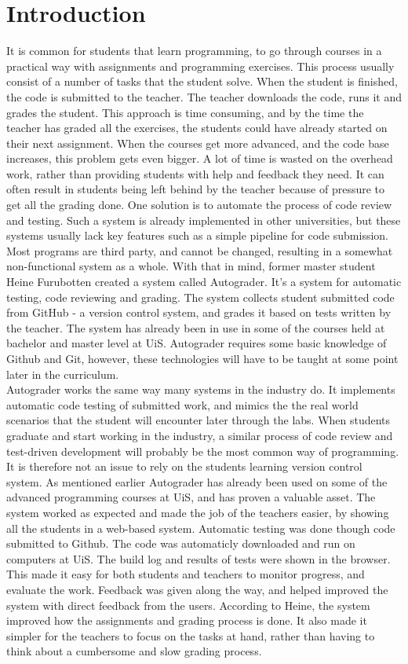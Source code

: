 \chapter*{Introduction}
It is common for students that learn programming, to go through courses in a practical way with assignments and programming exercises. This process usually consist of a number of tasks that the student solve. When the student is finished, the code is submitted to the teacher. The teacher downloads the code, runs it and grades the student. This approach is time consuming, and by the time the teacher has graded all the exercises, the students could have already started on their next assignment. When the courses get more advanced, and the code base increases, this problem gets even bigger. A lot of time is wasted on the overhead work, rather than providing students with help and feedback they need. It can often result in students being left behind by the teacher because of pressure to get all the grading done. One solution is to automate the process of code review and testing. Such a system is already implemented in other universities, but these systems usually lack key features such as a simple pipeline for code submission. Most programs are third party, and cannot be changed, resulting in a somewhat non-functional system as a whole. With that in mind, former master student Heine Furubotten created a system called Autograder. It's a system for automatic testing, code reviewing and grading. The system collects student submitted code from GitHub - a version control system, and grades it based on tests written by the teacher. The system has already been in use in some of the courses held at bachelor and master level at UiS. Autograder requires some basic knowledge of Github and Git, however, these technologies will have to be taught at some point later in the curriculum.
\\Autograder works the same way many systems in the industry do. It implements automatic code testing of submitted work, and mimics the the real world scenarios that the student will encounter later through the labs. When students graduate and start working in the industry, a similar process of code review and test-driven development will probably be the most common way of programming. It is therefore not an issue to rely on the students learning version control system. As mentioned earlier Autograder has already been used on some of the advanced programming courses at UiS, and has proven a valuable asset. The system worked as expected and made the job of the teachers easier, by showing all the students in a web-based system. Automatic testing was done though code submitted to Github. The code was automaticly downloaded and run on computers at UiS. The build log and results of tests were shown in the  browser. This made it easy for both students and teachers to monitor progress, and evaluate the work. Feedback was given along the way, and helped improved the system with direct feedback from the users. According to Heine, the system improved how the assignments and grading process is done. It also made it simpler for the teachers to focus on the tasks at hand, rather than having to think about a cumbersome and slow grading process.
